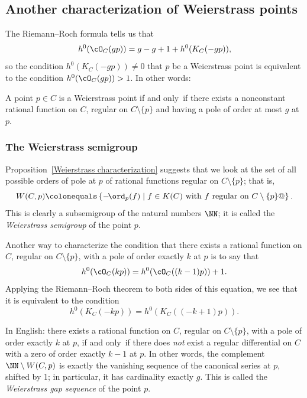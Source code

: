 \subsection*{Another characterization of Weierstrass points}

The 
Riemann--Roch formula
%
tells us that
$$
h^0(\cO_C(gp)) = g - g + 1 + h^0(K_C(-gp))
,
$$
so the condition $h^0(K_C(-gp)) \neq 0$ that $p$ be a Weierstrass point is
equivalent to the condition $h^0(\cO_C(gp)) > 1$. In other words:

\begin{proposition}\label{Weierstrass characterization}
A point $p \in C$ is a Weierstrass point if and only~if there exists
a nonconstant rational function on $C$, regular on $C \setminus \{p\}$
and having a pole of order at most $g$ at $p$.
\unif
\end{proposition}

\subsubsection*{The Weierstrass semigroup}

Proposition~\ref{Weierstrass characterization} suggests that we look
at the set of all possible orders of pole at $p$ of rational functions
regular on $C \setminus \{p\}$; that is,
$$
W(C,p) \colonequals  \left\{ -\! %
\ord_p(f) \mid f \in K(C) \text{ with $f$
regular on } C \setminus \{p\} @\right\}.
$$
This is clearly a subsemigroup of the natural numbers $\NN$; it is
%
called the \emph{Weierstrass semigroup} of the point $p$.

Another way to characterize the condition that there exists a rational
function on $C$, regular on $C \setminus \{p\}$, with a pole of order
exactly $k$ at $p$ is to say that
$$
h^0(\cO_C(kp)) = h^0(\cO_C((k-1)p)) + 1.
$$
Applying
the Riemann--Roch theorem
%
to both sides of this equation, we see that it is equivalent to the
condition
$$
h^0(K_C(-kp)) = h^0(K_C((-k+1)p)).
$$

In English: there exists a rational function on $C$, regular on $C
\setminus \{p\}$, with a pole of order exactly $k$ at $p$, if and only~if
there does \emph{not} exist a regular differential on $C$ with a zero
of order exactly $k-1$ at $p$.
In other words, the complement $\NN \setminus W(C,p)$ is exactly
the vanishing sequence of the canonical series at $p$, shifted by 1;
in particular, it has cardinality  exactly $g$. This is called the
%
\emph{Weierstrass gap sequence} of the point $p$.

